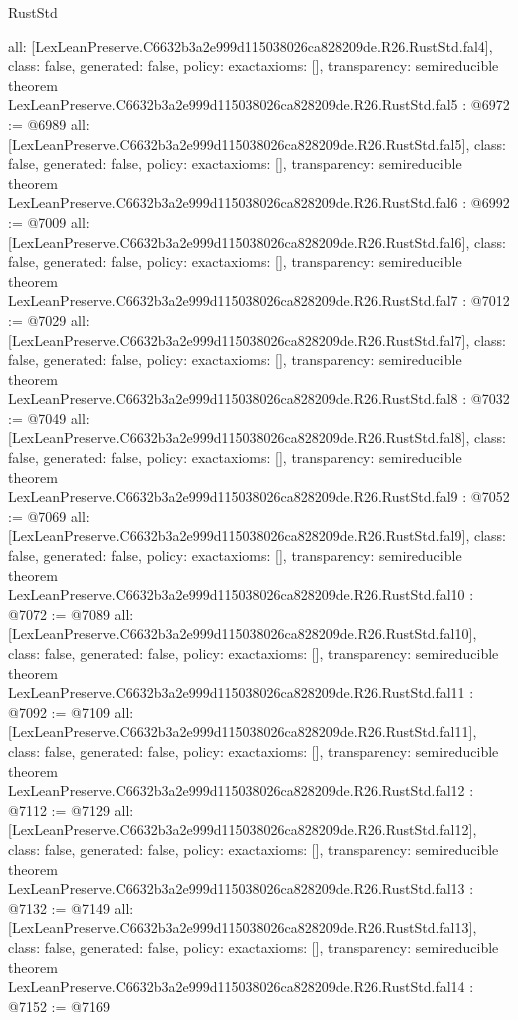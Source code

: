 \begin{lexlean}{RustStd}
\begin{coremodule}
{  all: [LexLeanPreserve.C6632b3a2e999d115038026ca828209de.R26.RustStd.fal4],
  class: false,
  generated: false,
  policy: exact{axioms: []},
  transparency: semireducible
}
theorem LexLeanPreserve.C6632b3a2e999d115038026ca828209de.R26.RustStd.fal5 : @6972 := @6989 {
  all: [LexLeanPreserve.C6632b3a2e999d115038026ca828209de.R26.RustStd.fal5],
  class: false,
  generated: false,
  policy: exact{axioms: []},
  transparency: semireducible
}
theorem LexLeanPreserve.C6632b3a2e999d115038026ca828209de.R26.RustStd.fal6 : @6992 := @7009 {
  all: [LexLeanPreserve.C6632b3a2e999d115038026ca828209de.R26.RustStd.fal6],
  class: false,
  generated: false,
  policy: exact{axioms: []},
  transparency: semireducible
}
theorem LexLeanPreserve.C6632b3a2e999d115038026ca828209de.R26.RustStd.fal7 : @7012 := @7029 {
  all: [LexLeanPreserve.C6632b3a2e999d115038026ca828209de.R26.RustStd.fal7],
  class: false,
  generated: false,
  policy: exact{axioms: []},
  transparency: semireducible
}
theorem LexLeanPreserve.C6632b3a2e999d115038026ca828209de.R26.RustStd.fal8 : @7032 := @7049 {
  all: [LexLeanPreserve.C6632b3a2e999d115038026ca828209de.R26.RustStd.fal8],
  class: false,
  generated: false,
  policy: exact{axioms: []},
  transparency: semireducible
}
theorem LexLeanPreserve.C6632b3a2e999d115038026ca828209de.R26.RustStd.fal9 : @7052 := @7069 {
  all: [LexLeanPreserve.C6632b3a2e999d115038026ca828209de.R26.RustStd.fal9],
  class: false,
  generated: false,
  policy: exact{axioms: []},
  transparency: semireducible
}
theorem LexLeanPreserve.C6632b3a2e999d115038026ca828209de.R26.RustStd.fal10 : @7072 := @7089 {
  all: [LexLeanPreserve.C6632b3a2e999d115038026ca828209de.R26.RustStd.fal10],
  class: false,
  generated: false,
  policy: exact{axioms: []},
  transparency: semireducible
}
theorem LexLeanPreserve.C6632b3a2e999d115038026ca828209de.R26.RustStd.fal11 : @7092 := @7109 {
  all: [LexLeanPreserve.C6632b3a2e999d115038026ca828209de.R26.RustStd.fal11],
  class: false,
  generated: false,
  policy: exact{axioms: []},
  transparency: semireducible
}
theorem LexLeanPreserve.C6632b3a2e999d115038026ca828209de.R26.RustStd.fal12 : @7112 := @7129 {
  all: [LexLeanPreserve.C6632b3a2e999d115038026ca828209de.R26.RustStd.fal12],
  class: false,
  generated: false,
  policy: exact{axioms: []},
  transparency: semireducible
}
theorem LexLeanPreserve.C6632b3a2e999d115038026ca828209de.R26.RustStd.fal13 : @7132 := @7149 {
  all: [LexLeanPreserve.C6632b3a2e999d115038026ca828209de.R26.RustStd.fal13],
  class: false,
  generated: false,
  policy: exact{axioms: []},
  transparency: semireducible
}
theorem LexLeanPreserve.C6632b3a2e999d115038026ca828209de.R26.RustStd.fal14 : @7152 := @7169 {
}
\end{coremodule}
\end{lexlean}
